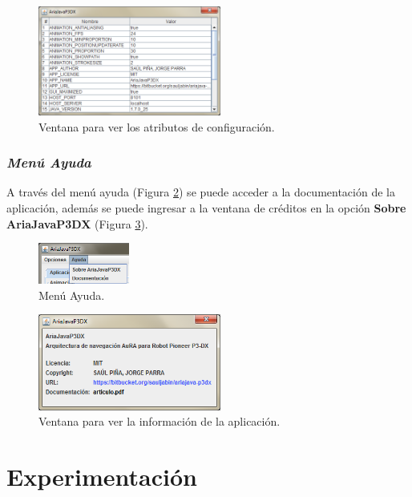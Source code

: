 \documentclass[11pt,twoside,A5]{article}
\newcommand{\reffigure}[1]{Figura \ref{#1}}
\newcommand{\refpfigure}[1]{(\reffigure{#1})}
\begin{document}
\begin{figure}[H]
\begin{center}
\includegraphics[width=6cm]{ver-configuracion.png} 
\caption{Ventana para ver los atributos de configuración.}
\label{fig:ver-configuracion}
\end{center}
\end{figure} 

\subsubsection*{\textit{Menú Ayuda}}

A través del menú ayuda \refpfigure{fig:menu-ayuda} se puede acceder a la documentación de 
la aplicación, además se puede ingresar a la ventana de créditos en la opción \textbf{Sobre AriaJavaP3DX} \refpfigure{fig:ventana-about}.

\begin{figure}[H]
\begin{center}
\includegraphics[width=3cm]{menu-ayuda2.png} 
\caption{Menú Ayuda.}
\label{fig:menu-ayuda}
\end{center}
\end{figure} 

\begin{figure}[H]
\begin{center}
\includegraphics[width=6cm]{ventana-about.png} 
\caption{Ventana para ver la información de la aplicación.}
\label{fig:ventana-about}
\end{center}
\end{figure} 

\section*{Experimentación}
\end{document}

